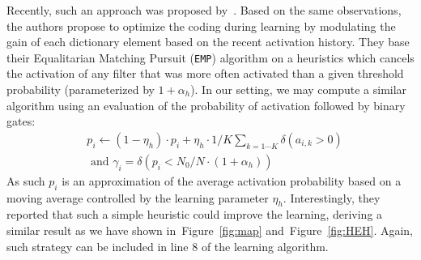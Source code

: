 \documentclass[vision,article,submit,oneauthor,pdftex]{Definitions/mdpi}
\newcommand{\seeFig}[1]{Figure~\ref{fig:#1}}%
\begin{document}
Recently, such an approach was proposed by~\cite{Sandin17}. Based on the same observations, the authors propose to optimize the coding during learning by modulating the gain of each dictionary element based on the recent activation history. They base their Equalitarian Matching Pursuit (\texttt{EMP}) algorithm on a heuristics which cancels the activation of any filter that was more often activated than a given threshold probability (parameterized by $1+\alpha_h$). In our setting, we may compute a similar algorithm using an evaluation of the probability of activation followed by binary gates:
\begin{align}%
&p_i \leftarrow (1- \eta_h ) \cdot p_i + \eta_h \cdot 1/K\sum_{k=1\cdots K} \delta(a_{i, k} > 0) \\ &\textrm{ and }
\gamma_i = \delta (p_i < N_0/N \cdot (1+\alpha_h) )
\end{align}%
As such $p_i$ is an approximation of the average activation probability based on a moving average controlled by the learning parameter $\eta_h$.
Interestingly, they reported that such a simple heuristic could improve the learning, deriving a similar result as we have shown in~\seeFig{map} and~\seeFig{HEH}. %
Again, such strategy can be included in line 8 of the learning algorithm.
\end{document}
